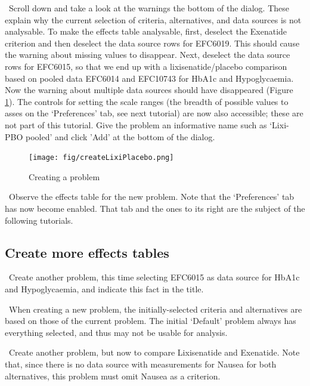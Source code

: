 \documentclass[00_mcda_tutorial.tex]{subfiles}
\begin{document}
\noindent \leftpointright \, Scroll down and take a look at the warnings the bottom of the dialog. These explain why the current selection of criteria, alternatives, and data sources is not analysable. To make the effects table analysable, first, deselect the Exenatide criterion and then deselect the data source rows for EFC6019. This should cause the warning about missing values to disappear. Next, deselect the data source rows for EFC6015, so that we end up with a lixisenatide/placebo comparison based on pooled data EFC6014 and EFC10743 for HbA1c and Hypoglycaemia. Now the warning about multiple data sources should have disappeared (Figure \ref{fig:create_lixi_placebo}). The controls for setting the scale ranges (the breadth of possible values to asses on the ‘Preferences’ tab, see next tutorial) are now also accessible; these are not part of this tutorial. Give the problem an informative name such as ‘Lixi-PBO pooled’ and click 'Add' at the bottom of the dialog.

\begin{figure}[!h]
    \centering
    \texttt{[image: fig/createLixiPlacebo.png]}
    \caption{Creating a problem}
    \label{fig:create_lixi_placebo}
\end{figure}

\noindent \leftpointright \, Observe the effects table for the new problem. Note that the ‘Preferences’ tab has now become enabled. That tab and the ones to its right are the subject of the following tutorials.

\subsection*{Create more effects tables}
\noindent \leftpointright \, Create another problem, this time selecting EFC6015 as data source for HbA1c and Hypoglycaemia, and indicate this fact in the title.
\newline

\noindent \faLightbulbO \, When creating a new problem, the initially-selected criteria and alternatives are based on those of the current problem. The initial ‘Default’ problem always has everything selected, and thus may not be usable for analysis.
\newline

\noindent \leftpointright \, Create another problem, but now to compare Lixisenatide and Exenatide. Note that, since there is no data source with measurements for Nausea for both alternatives, this problem must omit Nausea as a criterion.
\newline
\end{document}
